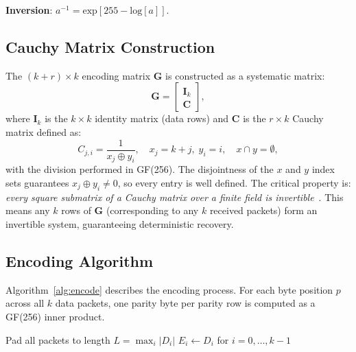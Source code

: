 \documentclass[conference]{IEEEtran}
\begin{document}
\noindent\textbf{Inversion}: $a^{-1} = \text{exp}[255 - \text{log}[a]]$.

\subsection{Cauchy Matrix Construction}

The $(k{+}r) \times k$ encoding matrix $\mathbf{G}$ is constructed as a
systematic matrix:
\begin{equation}
  \mathbf{G} = \begin{bmatrix} \mathbf{I}_k \\ \mathbf{C} \end{bmatrix},
  \label{eq:genmatrix}
\end{equation}
where $\mathbf{I}_k$ is the $k \times k$ identity matrix (data rows) and
$\mathbf{C}$ is the $r \times k$ Cauchy matrix defined as:
\begin{equation}
  C_{j,i} = \frac{1}{x_j \oplus y_i}, \quad
  x_j = k + j,\; y_i = i,\quad x \cap y = \emptyset,
  \label{eq:cauchy}
\end{equation}
with the division performed in GF(256). The disjointness of the $x$ and
$y$ index sets guarantees $x_j \oplus y_i \neq 0$, so every entry is
well defined. The critical property is: \emph{every square submatrix of
a Cauchy matrix over a finite field is invertible}~\cite{roth2006}. This
means any $k$ rows of $\mathbf{G}$ (corresponding to any $k$ received
packets) form an invertible system, guaranteeing deterministic recovery.

\subsection{Encoding Algorithm}

Algorithm~\ref{alg:encode} describes the encoding process. For each byte
position $p$ across all $k$ data packets, one parity byte per parity row
is computed as a GF(256) inner product.

\begin{algorithm}[!t]
\SetAlgoLined
{}
Pad all packets to length $L = \max_i |D_i|$\;
$E_i \leftarrow D_i$ for $i = 0, \ldots, k-1$   
\caption{FEC Encoding --- Cauchy / GF(256)}
\label{alg:encode}
\end{algorithm}
\end{document}
